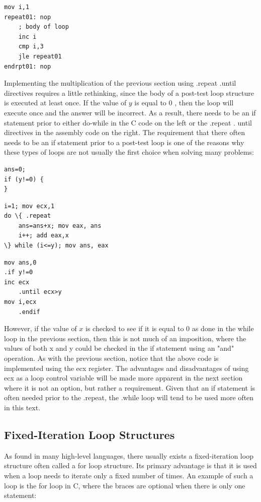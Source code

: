 \documentclass[10pt]{book}
\begin{document}
\begin{verbatim}
mov i,1
repeat01: nop
    ; body of loop
    inc i
    cmp i,3
    jle repeat01
endrpt01: nop
\end{verbatim}

Implementing the multiplication of the previous section using .repeat .until directives requires a little rethinking, since the body of a post-test loop structure is executed at least once. If the value of $y$ is equal to 0 , then the loop will execute once and the answer will be incorrect. As a result, there needs to be an if statement prior to either do-while in the C code on the left or the .repeat . until directives in the assembly code on the right. The requirement that there often needs to be an if statement prior to a post-test loop is one of the reasons why these types of loops are not usually the first choice when solving many problems:

\begin{verbatim}
ans=0;
if (y!=0) {
}
\end{verbatim}

\begin{verbatim}
i=1; mov ecx,1
do \{ .repeat
    ans=ans+x; mov eax, ans
    i++; add eax,x
\} while (i<=y); mov ans, eax
\end{verbatim}

\begin{verbatim}
mov ans,0
.if y!=0
inc ecx
    .until ecx>y
mov i,ecx
    .endif
\end{verbatim}

However, if the value of $x$ is checked to see if it is equal to 0 as done in the while loop in the previous section, then this is not much of an imposition, where the values of both x and y could be checked in the if statement using an "and" operation. As with the previous section, notice that the above code is implemented using the ecx register. The advantages and disadvantages of using ecx as a loop control variable will be made more apparent in the next section where it is not an option, but rather a requirement. Given that an if statement is often needed prior to the .repeat, the .while loop will tend to be used more often in this text.

\subsection{Fixed-Iteration Loop Structures}
As found in many high-level languages, there usually exists a fixed-iteration loop structure often called a for loop structure. Its primary advantage is that it is used when a loop needs to iterate only a fixed number of times. An example of such a loop is the for loop in C, where the braces are optional when there is only one statement:
\end{document}
